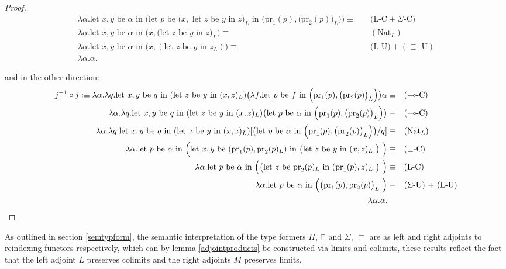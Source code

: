 \begin{thm}
\begin{proof}
\[\begin{split}
    \lambda \alpha. \text{let $x, y$ be $\alpha$ in $\Big ($let $p$ be ($x,$ let $z$ be $y$ in $z)_L$ in $\Big (\text{pr}_1(p), \big  (\text{pr}_2(p)\big )_L\Big) \Big )$}  \equiv&\quad \text{(L-C} + \text{$\Sigma$-C})\\
    \lambda \alpha. \text{let $x, y$ be $\alpha$ in $\Big (x, \big  ( \text{let $z$ be $y$ in $z$}\big )_L \Big )$}  \equiv& \quad (\text{Nat}_L)\\
    \lambda \alpha. \text{let $x, y$ be $\alpha$ in $\Big (x, (\text{let $z$ be $y$ in $z_L$}) \Big )$}  \equiv& \quad \text{(L-U}) + (\text{$\sqsubset$-U})\\
    \lambda \alpha. \alpha. \quad &
\end{split}
\]

and in the other direction:
\[
  \begin{split}
    j^{-1} \circ j : \equiv \lambda \alpha. \lambda q. \text{let $x, y$ be $q$ in (let $z$ be $y$ in $(x, z)_L$)} \big ( \lambda f. \text{let $p$ be $f$ in $\Big (\text{pr}_1(p), \big  (\text{pr}_2(p)\big )_L\Big)$}  \big ) \alpha \equiv& \quad (\text{$\multimap$-C})\\
    \lambda \alpha. \lambda q. \text{let $x, y$ be $q$ in (let $z$ be $y$ in $(x, z)_L$)} \big ( \text{let $p$ be $\alpha$ in $\Big (\text{pr}_1(p), \big  (\text{pr}_2(p)\big )_L\Big)$} \big ) \equiv& \quad (\text{$\multimap$-C})\\
        \lambda \alpha. \lambda q. \text{let $x, y$ be $q$ in (let $z$ be $y$ in $(x, z)_L$)} [\big ( \text{let $p$ be $\alpha$ in $\Big (\text{pr}_1(p), \big  (\text{pr}_2(p)\big )_L\Big)$} \big )/q] \equiv& \quad (\text{Nat}_L)\\
       \lambda \alpha. \text{let $p$ be $\alpha$ in \Big (let $x, y$ be $(\text{pr}_1(p), \text{pr}_2(p)_L)$ in \big (let $z$ be $y$ in $(x, z)_L$ \big ) \Big )} \equiv& \quad (\text{$\sqsubset$-C})\\
       \lambda \alpha. \text{let $p$ be $\alpha$ in \Big (\big (let $z$ be $\text{pr}_2(p)_L$ in $(\text{pr}_1(p), z)_L$ \big ) \Big )} \equiv& \quad (\text{L-C})\\
       \lambda \alpha. \text{let $p$ be $\alpha$ in \Big ($\big (\text{pr}_1(p), \text{pr}_2(p) \big )_L$ \Big )} \equiv& \quad \text{($\Sigma$-U) + (L-U)}\\
         \lambda \alpha. \alpha. \quad &
  \end{split}
\]
\end{proof}
\end{thm}
As outlined in section \ref{semtypform}, the semantic interpretation of the type formers $\Pi$, $\sqcap$ and $\Sigma$, $\sqsubset$ are as left and right adjoints to reindexing functors respectively, which can by lemma \ref{adjointproducts} be constructed via limits and colimits, these results reflect the fact that the left adjoint $L$ preserves colimits and the right adjoints $M$ preserves limits.
